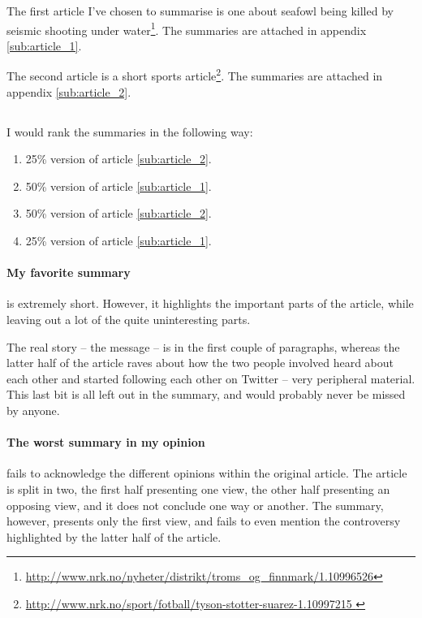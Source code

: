 \documentclass[11pt,a4paper]{article}
\begin{document}
      The first article I've chosen to summarise is one about seafowl being killed by seismic shooting under water\footnote{\url{http://www.nrk.no/nyheter/distrikt/troms_og_finnmark/1.10996526}}.
      The summaries are attached in appendix \ref{sub:article_1}.

      The second article is a short sports article\footnote{\url{http://www.nrk.no/sport/fotball/tyson-stotter-suarez-1.10997215 }}. The summaries are attached in appendix \ref{sub:article_2}.


    \subsection{} %

      I would rank the summaries in the following way:

      \begin{enumerate}
        \item 25\% version of article \ref{sub:article_2}.
        \item 50\% version of article \ref{sub:article_1}.
        \item 50\% version of article \ref{sub:article_2}.
        \item 25\% version of article \ref{sub:article_1}.
      \end{enumerate}

      \paragraph{My favorite summary} is extremely short.
      However, it highlights the important parts of the article, while leaving out a lot of the quite uninteresting parts.

      The real story -- the message -- is in the first couple of paragraphs, whereas the latter half of the article raves about how the two people involved heard about each other and started following each other on Twitter -- very peripheral material.
      This last bit is all left out in the summary, and would probably never be missed by anyone.

      \paragraph{The worst summary in my opinion} fails to acknowledge the different opinions within the original article.
      The article is split in two, the first half presenting one view, the other half presenting an opposing view, and it does not conclude one way or another.
      The summary, however, presents only the first view, and fails to even mention the controversy highlighted by the latter half of the article.
\end{document}
